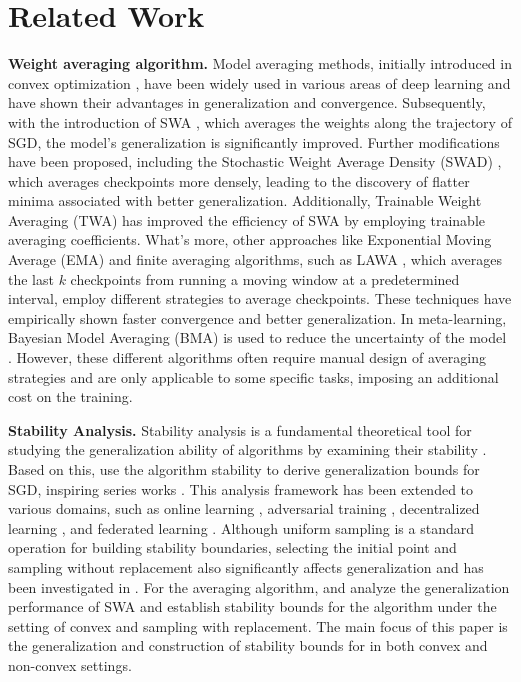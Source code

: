 \section{Related Work}
\label{sec:ReW}

\textbf{Weight averaging algorithm.}
Model averaging methods, initially introduced in convex optimization \cite{ruppert1988efficient, polyak1992acceleration,li2023deep}, have been widely used in various areas of deep learning and have shown their advantages in generalization and convergence. Subsequently, with the introduction of SWA \cite{izmailov2018averaging}, which averages the weights along the trajectory of SGD, the model's generalization is significantly improved. Further modifications have been proposed, including the Stochastic Weight Average Density (SWAD) \cite{cha2021swad}, which averages checkpoints more densely, leading to the discovery of flatter minima associated with better generalization. Additionally, Trainable Weight Averaging (TWA) \cite{li2022trainable} has improved the efficiency of SWA by employing trainable averaging coefficients. What's more, other approaches like Exponential Moving Average (EMA) \cite{szegedy2016rethinking} and finite averaging algorithms, such as LAWA \cite{kaddour2022stop, sanyal2023early}, which averages the last $k$ checkpoints from running a moving window at a predetermined interval, employ different strategies to average checkpoints. These techniques have empirically shown faster convergence and better generalization. In meta-learning, Bayesian Model Averaging (BMA) is used to reduce the uncertainty of the model \cite{huang2020meta}. However, these different algorithms often require manual design of averaging strategies and are only applicable to some specific tasks, imposing an additional cost on the training.

\textbf{Stability Analysis.}
Stability analysis is a fundamental theoretical tool for studying the generalization ability of algorithms by examining their stability \citep{devroye1979distribution, bousquet2002stability, mukherjee2006learning, shalev2010learnability}. Based on this, \citet{hardt2016train} use the algorithm stability to derive generalization bounds for SGD, inspiring series works \cite{charles2018stability, zhou2018generalization, yuan2019stagewise, lei2020sharper}. This analysis framework has been extended to various domains, such as online learning \citep{yang2021simple}, adversarial training \citep{xiao2022stability}, decentralized learning \citep{zhu2023stability}, and federated learning \citep{sun2023understanding, sun2023mode}. Although uniform sampling is a standard operation for building stability boundaries, selecting the initial point and sampling without replacement also significantly affects generalization and has been investigated in \citet{shamir2016without, kuzborskij2018data}. For the averaging algorithm, \citet{hardt2016train} and \citet{xiao2022stability} analyze the generalization performance of SWA and establish stability bounds for the algorithm under the setting of convex and sampling with replacement. The main focus of this paper is the generalization and construction of stability bounds for \method{} in both convex and non-convex settings.

